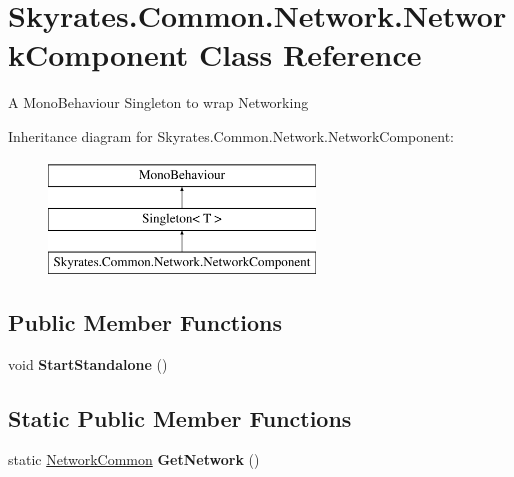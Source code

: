 \hypertarget{class_skyrates_1_1_common_1_1_network_1_1_network_component}{\section{Skyrates.\-Common.\-Network.\-Network\-Component Class Reference}
\label{class_skyrates_1_1_common_1_1_network_1_1_network_component}
}


A Mono\-Behaviour Singleton to wrap Networking  


Inheritance diagram for Skyrates.\-Common.\-Network.\-Network\-Component\-:\begin{figure}[H]
\begin{center}
\leavevmode
\includegraphics[height=3.000000cm]{class_skyrates_1_1_common_1_1_network_1_1_network_component}
\end{center}
\end{figure}
\subsection*{Public Member Functions}
\begin{DoxyCompactItemize}
\item 
\hypertarget{class_skyrates_1_1_common_1_1_network_1_1_network_component_a7c114635cacfe2c83daa34b24f19ddfe}{void {\bfseries Start\-Standalone} ()}\label{class_skyrates_1_1_common_1_1_network_1_1_network_component_a7c114635cacfe2c83daa34b24f19ddfe}

\end{DoxyCompactItemize}
\subsection*{Static Public Member Functions}
\begin{DoxyCompactItemize}
\item 
\hypertarget{class_skyrates_1_1_common_1_1_network_1_1_network_component_a19c9f558a31ba9abcdd177852d7c0020}{static \hyperlink{class_skyrates_1_1_common_1_1_network_1_1_network_common}{Network\-Common} {\bfseries Get\-Network} ()}\label{class_skyrates_1_1_common_1_1_network_1_1_network_component_a19c9f558a31ba9abcdd177852d7c0020}

\end{DoxyCompactItemize}
